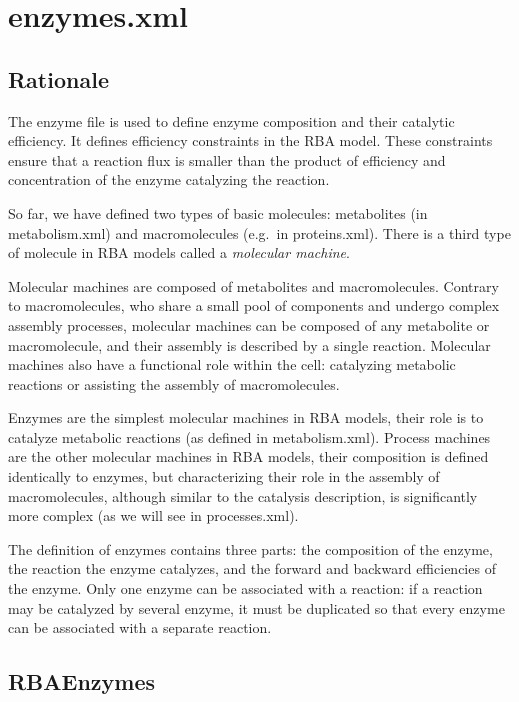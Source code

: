 
\section{enzymes.xml}

\subsection{Rationale}

The enzyme file is used to define enzyme composition and their catalytic efficiency.
It defines efficiency constraints in the RBA model.
These constraints ensure that a reaction flux is smaller than
the product of efficiency and concentration of the enzyme catalyzing
the reaction.

So far, we have defined two types of basic molecules:
metabolites (in metabolism.xml) and macromolecules (e.g.\ in proteins.xml).
There is a third type of molecule in RBA models called a \emph{molecular machine}.

Molecular machines are composed of metabolites and macromolecules.
Contrary to macromolecules, who share a small pool of components and undergo
complex assembly processes, molecular machines can be composed of any
metabolite or macromolecule, and their assembly is described by a single reaction.
Molecular machines also have a functional role within the cell:
catalyzing metabolic reactions or assisting the assembly of macromolecules.

Enzymes are the simplest molecular machines in RBA models,
their role is to catalyze metabolic reactions (as defined in metabolism.xml).
Process machines are the other molecular machines in RBA models,
their composition is defined identically to enzymes,
but characterizing their role in the assembly of macromolecules,
although similar to the catalysis description, is significantly more complex
(as we will see in processes.xml).

The definition of enzymes contains three parts:
the composition of the enzyme, the reaction the enzyme catalyzes,
and the forward and backward efficiencies of the enzyme.
Only one enzyme can be associated with a reaction:
if a reaction may be catalyzed by several enzyme,
it must be duplicated so that every enzyme can be associated with a separate
reaction.

\subsection{RBAEnzymes}
\label{sec:rba_enzymes}

